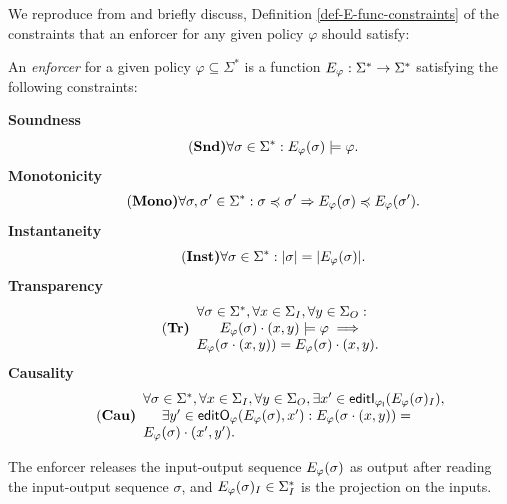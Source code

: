 We reproduce  from \cite{spin17} and briefly discuss,  Definition \ref{def-E-func-constraints} of the constraints that an enforcer for any given policy $\varphi$ should satisfy:
\begin{definition}
	\label{def-E-func-constraints}
	An {\em enforcer} for a given policy $\varphi\subseteq\Sigma^*$ is a function $E_{\varphi}: \Sigma^*\rightarrow \Sigma^*$ satisfying the following constraints:
	
	\noindent
	{\bf Soundness}
	\begin{equation}
		\tag{\bf Snd}\label{eq:snd}
		\forall \sigma \in \Sigma^*: E_{\varphi}(\sigma) \models \varphi.
	\end{equation}
	{\bf Monotonicity}
	\begin{equation}
		\tag{\bf Mono}\label{eq:mono}
		\forall \sigma, \sigma' \in \Sigma^*: \sigma\preccurlyeq \sigma' \Rightarrow E_{\varphi}(\sigma) \preccurlyeq E_{\varphi}(\sigma').
	\end{equation}
	{\bf Instantaneity}
	\begin{equation}
		\tag{\bf Inst}\label{eq:inst}
		\forall \sigma \in \Sigma^*: |\sigma| =  |E_{\varphi}(\sigma)|.
	\end{equation}
	{\bf Transparency}
	\begin{equation}
		\tag{\bf Tr}\label{eq:tr}
		\begin{array}{ll}
			\forall \sigma\in \Sigma^*, \forall x \in \Sigma_I,\forall y \in \Sigma_O:\\
			~~~~~E_{\varphi}(\sigma)\cdot(x,y)\models \varphi \implies \\ E_{\varphi}(\sigma\cdot(x,y)) = E_{\varphi}(\sigma)\cdot(x,y).
		\end{array}
	\end{equation}
	{\bf Causality}
	\begin{equation}
		\tag{\bf Cau}\label{eq:ca}
		\begin{array}{ll}
			\forall \sigma \in \Sigma^*, \forall x \in \Sigma_I,\forall y \in \Sigma_O,\exists x' \in \mathsf{editI_{\varphi_I}}(E_{\varphi}(\sigma)_I), \\
			~~~~\exists y' \in \mathsf{editO_{\varphi}}(E_{\varphi}(\sigma), x'): E_{\varphi}(\sigma\cdot(x,y))= \\ E_{\varphi}(\sigma)\cdot(x',y').
		\end{array}
	\end{equation}
\end{definition}
The enforcer releases the input-output sequence $E_{\varphi}(\sigma)$ as output after reading the input-output sequence $\sigma$, and $E_{\varphi}(\sigma)_I \in \Sigma_I^*$ is the projection on the inputs.
